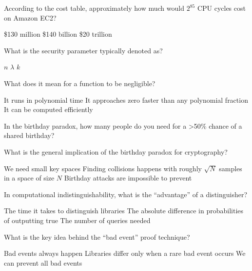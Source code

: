 \documentclass[10pt,a4paper,american]{exam}
\begin{document}
\begin{questions}
	\question According to the cost table, approximately how much would $2^{85}$ CPU cycles cost on Amazon EC2?
	\begin{randomizechoices}
		\choice \$130 million
		\CorrectChoice \$140 billion
		\choice \$20 trillion
	\end{randomizechoices}

	\question What is the security parameter typically denoted as?
	\begin{randomizechoices}
		\choice $n$
		\CorrectChoice $\lambda$
		\choice $k$
	\end{randomizechoices}

	\question What does it mean for a function to be negligible?
	\begin{randomizechoices}
		\choice It runs in polynomial time
		\CorrectChoice It approaches zero faster than any polynomial fraction
		\choice It can be computed efficiently
	\end{randomizechoices}

	\question In the birthday paradox, how many people do you need for a >50\% chance of a shared birthday?
	\begin{randomizechoices}
		\choice 50
		\choice 183
		\CorrectChoice 23
	\end{randomizechoices}

	\question What is the general implication of the birthday paradox for cryptography?
	\begin{randomizechoices}
		\choice We need small key spaces
		\CorrectChoice Finding collisions happens with roughly $\sqrt{N}$ samples in a space of size $N$
		\choice Birthday attacks are impossible to prevent
	\end{randomizechoices}

	\question In computational indistinguishability, what is the ``advantage'' of a distinguisher?
	\begin{randomizechoices}
		\choice The time it takes to distinguish libraries
		\CorrectChoice The absolute difference in probabilities of outputting true
		\choice The number of queries needed
	\end{randomizechoices}

	\question What is the key idea behind the ``bad event'' proof technique?
	\begin{randomizechoices}
		\choice Bad events always happen
		\CorrectChoice Libraries differ only when a rare bad event occurs
		\choice We can prevent all bad events
	\end{randomizechoices}


\end{questions}
\end{document}
